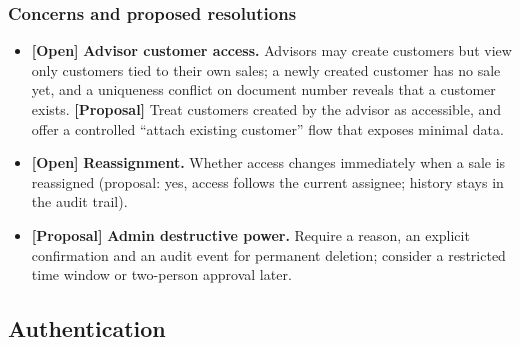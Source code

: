\documentclass[11pt,a4paper]{article}
\newcommand{\tagprop}{\textcolor{orange!80!black}{\textbf{[Proposal]}}}
\newcommand{\tagopen}{\textcolor{red!70!black}{\textbf{[Open]}}}
\begin{document}
\subsubsection*{Concerns and proposed resolutions}
\begin{itemize}
	\item \tagopen{} \textbf{Advisor customer access.} Advisors may create
	      customers but view only customers tied to their own sales; a newly created
	      customer has no sale yet, and a uniqueness conflict on document number reveals
	      that a customer exists. \tagprop{} Treat customers created by the advisor as
	      accessible, and offer a controlled ``attach existing customer'' flow that
	      exposes minimal data.
	\item \tagopen{} \textbf{Reassignment.} Whether access changes immediately when a sale is reassigned (proposal: yes, access follows the current assignee; history stays in the audit trail).
	\item \tagprop{} \textbf{Admin destructive power.} Require a reason, an
	      explicit confirmation and an audit event for permanent deletion; consider a
	      restricted time window or two-person approval later.
\end{itemize}

\subsection{Authentication}
\end{document}
